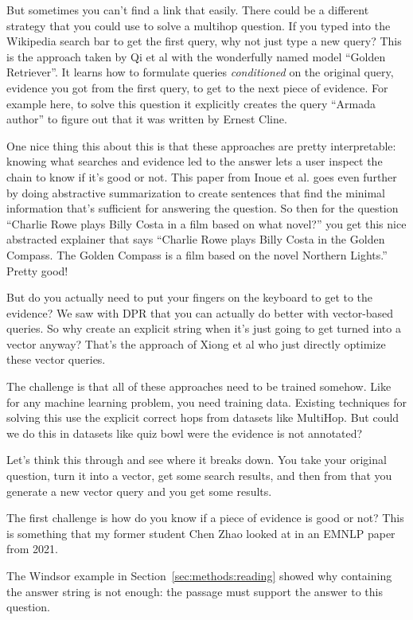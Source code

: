 But sometimes you can’t find a link that easily.  There could be a different strategy that you could use to solve a multihop question.  If you typed into the Wikipedia search bar to get the first query, why not just type a new query?  This is the approach taken by Qi et al with the wonderfully named model “Golden Retriever”.  It learns how to formulate queries \emph{conditioned} on the original query, evidence you got from the first query, to get to the next piece of evidence.  For example here, to solve this question it explicitly creates the query “Armada author” to figure out that it was written by Ernest Cline.

One nice thing this about this is that these approaches are pretty interpretable: knowing what searches and evidence led to the answer lets a user inspect the chain to know if it’s good or not.  This paper from Inoue et al. goes even further by doing abstractive summarization to create sentences that find the minimal information that’s sufficient for answering the question.  So then for the question “Charlie Rowe plays Billy Costa in a film based on what novel?” you get this nice abstracted explainer that says “Charlie Rowe plays Billy Costa in the Golden Compass.  The Golden Compass is a film based on the novel Northern Lights.”  Pretty good!

But do you actually need to put your fingers on the keyboard to get to the evidence?  We saw with DPR that you can actually do better with vector-based queries.  So why create an explicit string when it’s just going to get turned into a vector anyway?  That’s the approach of Xiong et al who just directly optimize these vector queries.

The challenge is that all of these approaches need to be trained somehow.  Like for any machine learning problem, you need training data.  Existing techniques for solving this use the explicit correct hops from datasets like MultiHop.  But could we do this in datasets like quiz bowl were the evidence is not annotated?  

Let’s think this through and see where it breaks down.  You take your original question, turn it into a vector, get some search results, and then from that you generate a new vector query and you get some results.  

The first challenge is how do you know if a piece of evidence is good or not?  This is something that my former student Chen Zhao looked at in an EMNLP paper from 2021.

The Windsor example in Section~\ref{sec:methods:reading} showed why containing the answer string is not enough: the passage must support the answer to this question.

